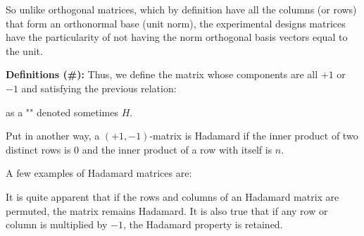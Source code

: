 	So unlike orthogonal matrices, which by definition have all the columns (or rows) that form an orthonormal base (unit norm), the experimental designs matrices have the particularity of not having the norm orthogonal basis vectors equal to the unit.
	
	\textbf{Definitions (\#\mydef):}
	Thus, we define the matrix whose components are all $+1$ or $-1$ and satisfying the previous relation:
		
	as a "" denoted sometimes $H$. 
	
	Put in another way, a $(+1,-1)$-matrix is Hadamard if the inner
product of two distinct rows is 0 and the inner product of a
row with itself is $n$.

	A few examples of Hadamard matrices are:
	
	It is quite apparent that if the rows and columns of an Hadamard matrix are permuted, the matrix remains Hadamard. It is also true that if any row or column is multiplied by $-1$, the Hadamard property is retained.

